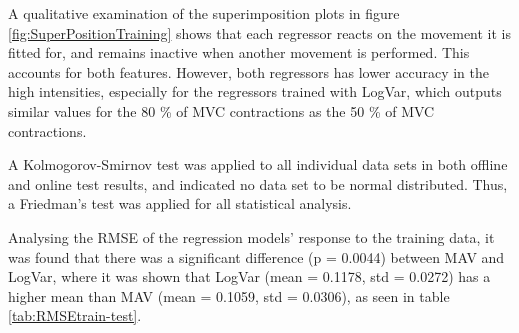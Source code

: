 \begin{multicols}{2}
	

A qualitative examination of the superimposition plots in figure \ref{fig:SuperPositionTraining} shows that each regressor reacts on the movement it is fitted for, and remains inactive when another movement is performed. This accounts for both features. However, both regressors has lower accuracy in the high intensities, especially for the regressors trained with LogVar, which outputs similar values for the 80 \% of MVC contractions as the 50 \% of MVC contractions.
	
	
	\begin{center}
	\end{center}
	A Kolmogorov-Smirnov test was applied to all individual data sets in both offline and online test results, and indicated no data set to be normal distributed. Thus, a Friedman's test was applied for all statistical analysis.
	
	Analysing the RMSE of the regression models' response to the training data, it was found that there was a significant difference (p = 0.0044) between MAV and LogVar, where it was shown that LogVar (mean = 0.1178, std = 0.0272) has a higher mean than MAV (mean = 0.1059, std = 0.0306), as seen in table \ref{tab:RMSEtrain-test}. 
	

\end{multicols}
